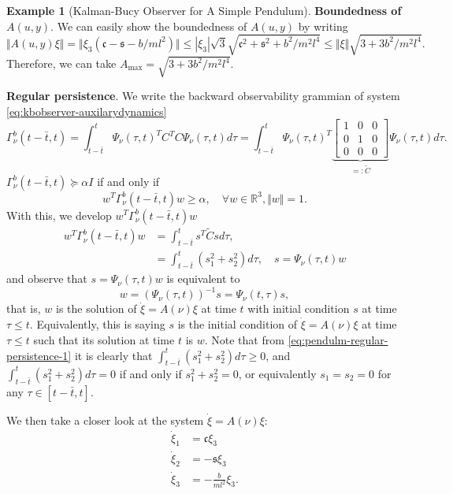 \documentclass[
]{book}
\theoremstyle{definition}
\theoremstyle{definition}
\newtheorem{example}{Example}[chapter]
\theoremstyle{definition}
\theoremstyle{definition}
\theoremstyle{remark}
\begin{document}
\begin{example}[Kalman-Bucy Observer for A Simple Pendulum]
\textbf{Boundedness of \(A(u,y)\)}. We can easily show the boundedness of \(A(u,y)\) by writing
\[
\Vert A(u,y) \xi \Vert = \Vert \xi_3 (\mathfrak{c} - \mathfrak{s} - b/ml^2) \Vert  \leq |\xi_3| \sqrt{3} \sqrt{\mathfrak{c}^2 + \mathfrak{s}^2 + b^2 / m^2 l^4} \leq \Vert \xi \Vert \sqrt{3 + 3b^2 / m^2 l^4}. 
\]
Therefore, we can take \(A_{\max} = \sqrt{3 + 3b^2 / m^2 l^4}\).

\textbf{Regular persistence}. We write the backward observability grammian of system \eqref{eq:kbobserver-auxilarydynamics}
\[
\Gamma_\nu^b(t - \bar{t},t) = \int_{t - \bar{t}}^t \Psi_\nu(\tau,t)^T C^T C \Psi_\nu (\tau, t) d \tau = \int_{t - \bar{t}}^t \Psi_\nu(\tau,t)^T \underbrace{\begin{bmatrix} 
1 & 0 & 0 \\
0 & 1 & 0 \\
0 & 0 & 0
\end{bmatrix}}_{=:\tilde{C}}
\Psi_\nu (\tau, t) d \tau.
\]
\(\Gamma_\nu^b(t - \bar{t},t) \succeq \alpha I\) if and only if
\[
w^T \Gamma_\nu^b(t - \bar{t},t) w \geq \alpha, \quad \forall w \in \mathbb{R}^3, \Vert w \Vert = 1.
\]
With this, we develop \(w^T \Gamma_\nu^b(t - \bar{t},t) w\)
\begin{equation}
\begin{split}
w^T \Gamma_\nu^b(t - \bar{t},t) w &= \int_{t - \bar{t}}^t s^T \tilde{C} s d\tau, \\
& = \int_{t - \bar{t}}^t \left( s_1^2 + s_2^2 \right) d\tau, \quad s = \Psi_\nu (\tau, t) w
\end{split}
\label{eq:pendulm-regular-persistence-1}
\end{equation}
and observe that \(s = \Psi_\nu (\tau,t) w\) is equivalent to
\[
w = (\Psi_\nu (\tau,t))^{-1} s = \Psi_\nu (t,\tau) s,
\]
that is, \(w\) is the solution of \(\dot{\xi} = A(\nu) \xi\) at time \(t\) with initial condition \(s\) at time \(\tau \leq t\). Equivalently, this is saying \(s\) is the initial condition of \(\dot{\xi} = A(\nu) \xi\) at time \(\tau \leq t\) such that its solution at time \(t\) is \(w\). Note that from \eqref{eq:pendulm-regular-persistence-1} it is clearly that \(\int_{t - \bar{t}}^t \left( s_1^2 + s_2^2 \right) d\tau \geq 0\), and \(\int_{t - \bar{t}}^t \left( s_1^2 + s_2^2 \right) d\tau = 0\) if and only if \(s_1^2 + s_2^2 = 0\), or equivalently \(s_1 = s_2 = 0\) for any \(\tau \in [t - \bar{t}, t]\).

We then take a closer look at the system \(\dot{\xi} = A(\nu) \xi\):
\begin{equation}
\begin{split}
\dot{\xi}_1 &= \mathfrak{c} \xi_3 \\
\dot{\xi}_2 &= -\mathfrak{s} \xi_3 \\
\dot{\xi}_3 &= - \frac{b}{ml^2} \xi_3.
\end{split}
\label{eq:pendulm-state-affine-auxiliarysystem}
\end{equation}


\end{example}
\end{document}
